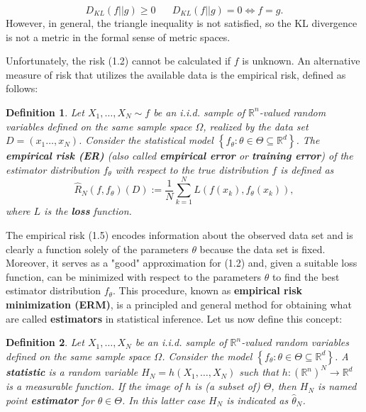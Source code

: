 \documentclass{report}
\newtheorem{definition}{Definition}[chapter]
\begin{document}
\begin{equation}
 D_{KL}(f||g) \geq 0\,\,\,\,\,\,\,\,\,\, D_{KL}(f||g) = 0 \iff f = g.
\end{equation}
However, in general, the triangle inequality is not satisfied, so the KL divergence is not a metric in the formal sense of metric spaces.

Unfortunately, the risk (1.2) cannot be calculated if $f$ is unknown. An alternative measure of risk that utilizes the available data is the empirical risk, defined as follows:

\begin{definition}
Let $X_1,\dots,X_N \sim f$ be an i.i.d. sample of $\mathbb{R}^n$-valued random variables defined on the same sample space $\Omega$, realized by the data set $D = (x_1\dots,x_N)$. Consider the statistical model $\left\{f_\theta : \theta \in \Theta \subseteq \mathbb{R}^d\right\}$. The \textbf{empirical risk (ER)} (also called \textbf{empirical error} or \textbf{training error}) of the estimator distribution $f_\theta$ with respect to the true distribution $f$ is defined as
\begin{equation}
\hat{R}_N(f,f_\theta)(D) := \frac{1}{N}\sum_{k=1}^{N}L(f(x_k),f_\theta(x_k)),
\end{equation}
where $L$ is the \textbf{loss} function.
\end{definition}

The empirical risk (1.5) encodes information about the observed data set and is clearly a function solely of the parameters $\theta$ because the data set is fixed. Moreover, it serves as a "good" approximation for (1.2) and, given a suitable loss function, can be minimized with respect to the parameters $\theta$ to find the best estimator distribution $f_\theta$. This procedure, known as \textbf{empirical risk minimization (ERM)}, is a principled and general method for obtaining what are called \textbf{estimators} in statistical inference. Let us now define this concept:

\begin{definition}
Let $X_1,\dots,X_N$ be an i.i.d. sample of $\mathbb{R}^n$-valued random variables defined on the same sample space $\Omega$. Consider the model $\left\{f_\theta : \theta \in \Theta \subseteq \mathbb{R}^d\right \}$. A \textbf{statistic} is a random variable $H_N = h(X_1,\dots,X_N)$ such that $h : (\mathbb{R}^n)^N \to \mathbb{R}^d$ is a measurable function. If the image of $h$ is (a subset of) $\Theta$, then $H_N$ is named point \textbf{estimator} for $\theta \in \Theta$. In this latter case $H_N$ is indicated as $\hat{\theta}_N$.
\end{definition}
\end{document}
